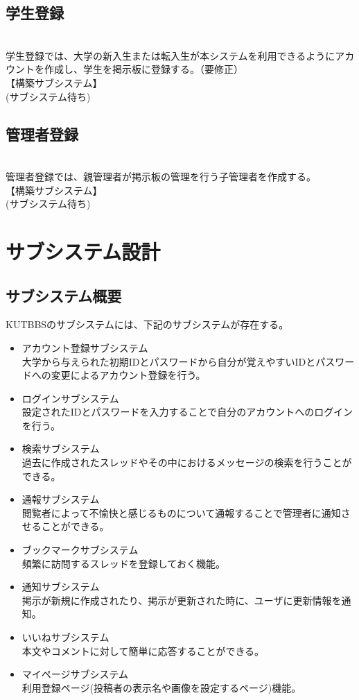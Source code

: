\documentclass[a4j]{jarticle}
\begin{document}
\subsection{学生登録}
\\学生登録では、大学の新入生または転入生が本システムを利用できるようにアカウントを作成し、学生を掲示板に登録する。（要修正）
\\【構築サブシステム】
\\ (サブシステム待ち)

\subsection{管理者登録}
\\管理者登録では、親管理者が掲示板の管理を行う子管理者を作成する。
\\【構築サブシステム】
\\ (サブシステム待ち)

\section{サブシステム設計}
\subsection{サブシステム概要}
KUTBBSのサブシステムには、下記のサブシステムが存在する。
\begin{itemize}
\item アカウント登録サブシステム\\
大学から与えられた初期IDとパスワードから自分が覚えやすいIDとパスワードへの変更によるアカウント登録を行う。
\item ログインサブシステム\\
設定されたIDとパスワードを入力することで自分のアカウントへのログインを行う。
\item 検索サブシステム\\
過去に作成されたスレッドやその中におけるメッセージの検索を行うことができる。
\item 通報サブシステム\\
閲覧者によって不愉快と感じるものについて通報することで管理者に通知させることができる。
\item ブックマークサブシステム\\
頻繁に訪問するスレッドを登録しておく機能。
\item 通知サブシステム\\
掲示が新規に作成されたり、掲示が更新された時に、ユーザに更新情報を通知。
\item いいねサブシステム\\
本文やコメントに対して簡単に応答することができる。
\item マイページサブシステム\\
利用登録ページ(投稿者の表示名や画像を設定するページ)機能。
\end{itemize}
\end{document}
